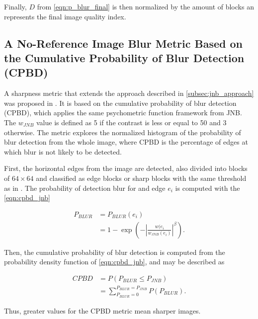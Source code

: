 \noindent Finally, $D$ from \autoref{eqn:p_blur_final} is then normalized by the amount of blocks an represents the final image quality index.

\subsection{A No-Reference Image Blur Metric Based on the Cumulative Probability of Blur Detection (CPBD)}

A sharpness metric that extends the approach described in \ref{subsec:jnb_approach} was proposed in \cite{narvekar2011noreference}. It is based on the cumulative probability of blur detection (CPBD), which applies the same psychometric function framework from JNB. The $w_{JNB}$ value is defined as 5 if the contrast is less or equal to 50 and 3 otherwise. The metric explores the normalized histogram of the probability of blur detection from the whole image, where CPBD is the percentage of edges at which blur is not likely to be detected.

First, the horizontal edges from the image are detected, also divided into blocks of $64 \times 64$ and classified as edge blocks or sharp blocks with the same threshold as in . The probability of detection blur for and edge $e_{i}$ is computed with the \autoref{eqn:cpbd_jnb}

\begin{equation}
\label{eqn:cpbd_jnb}
\begin{split}
    P_{BLUR} &= P_{BLUR}(e_{i})\\
    &= 1 - \exp{
    \left(
        - \left|
            \frac{w(e_{i}}{w_{JNB}(e_{i})}
        \right|^\beta
    \right)}.
\end{split}
\end{equation}

\noindent Then, the cumulative probability of blur detection is computed from the probability density function of \autoref{eqn:cpbd_jnb}, and may be described as

\begin{equation}
\label{eqn:cpbd}
\begin{split}
    CPBD &= P(P_{BLUR} \leq P_{JNB})\\
    &=\sum_{P_{BLUR} = 0}^{P_{BLUR} = P_{JNB}}P(P_{BLUR}).
\end{split}
\end{equation}

\noindent Thus, greater values for the CPBD metric mean sharper images.


